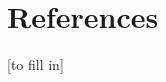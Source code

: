 \documentclass[twocolumn]{bmcart}%
\begin{document}


\section{References}
[to fill in] \\
\end{document}

